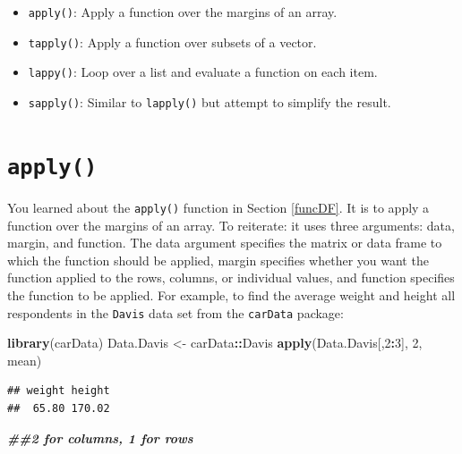 \documentclass[
]{book}
\newenvironment{Shaded}{\begin{snugshade}}{\end{snugshade}}
\newcommand{\DecValTok}[1]{\textcolor[rgb]{0.00,0.00,0.81}{#1}}
\newcommand{\DocumentationTok}[1]{\textcolor[rgb]{0.56,0.35,0.01}{\textbf{\textit{#1}}}}
\newcommand{\FunctionTok}[1]{\textcolor[rgb]{0.13,0.29,0.53}{\textbf{#1}}}
\newcommand{\NormalTok}[1]{#1}
\newcommand{\OtherTok}[1]{\textcolor[rgb]{0.56,0.35,0.01}{#1}}
\newcommand{\SpecialCharTok}[1]{\textcolor[rgb]{0.81,0.36,0.00}{\textbf{#1}}}
\providecommand{\tightlist}{%
  \setlength{\itemsep}{0pt}\setlength{\parskip}{0pt}}
\theoremstyle{definition}
\theoremstyle{definition}
\theoremstyle{definition}
\theoremstyle{definition}
\theoremstyle{remark}
\begin{document}
\begin{itemize}
\tightlist
\item
  \texttt{apply()}: Apply a function over the margins of an array.
\item
  \texttt{tapply()}: Apply a function over subsets of a vector.
\item
  \texttt{lappy()}: Loop over a list and evaluate a function on each item.
\item
  \texttt{sapply()}: Similar to \texttt{lapply()} but attempt to simplify the result.
\end{itemize}

\hypertarget{apply}{%
\section{\texorpdfstring{\texttt{apply()}}{apply()}}\label{apply}}

You learned about the \texttt{apply()} function in Section \ref{funcDF}. It is to apply a function over the margins of an array. To reiterate: it uses three arguments: data, margin, and function. The data argument specifies the matrix or data frame to which the function should be applied, margin specifies whether you want the function applied to the rows, columns, or individual values, and function specifies the function to be applied. For example, to find the average weight and height all respondents in the \texttt{Davis} data set from the \texttt{carData} package:

\begin{Shaded}
\begin{Highlighting}[]
\FunctionTok{library}\NormalTok{(carData)}
\NormalTok{Data.Davis }\OtherTok{\textless{}{-}}\NormalTok{ carData}\SpecialCharTok{::}\NormalTok{Davis}
\FunctionTok{apply}\NormalTok{(Data.Davis[,}\DecValTok{2}\SpecialCharTok{:}\DecValTok{3}\NormalTok{], }\DecValTok{2}\NormalTok{, mean)}
\end{Highlighting}
\end{Shaded}

\begin{verbatim}
## weight height 
##  65.80 170.02
\end{verbatim}

\begin{Shaded}
\begin{Highlighting}[]
\DocumentationTok{\#\#2 for columns, 1 for rows}
\end{Highlighting}
\end{Shaded}
\end{document}
